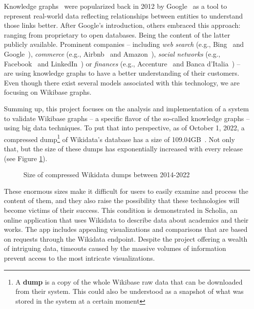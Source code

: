 Knowledge graphs~\cite{https://doi.org/10.48550/arxiv.2110.11709} were popularized back in 2012 by Google~\cite{web:knowledge_graphs:google} as a tool to represent real-world data reflecting relationships between entities to understand those links better. After Google's introduction, others embraced this approach: ranging from proprietary to open databases. Being the content of the latter publicly available. Prominent companies -- including \textit{web search} (e.g., Bing~\cite{knowledge:graphs:usage:bing} and Google~\cite{web:knowledge_graphs:google}), \textit{commerce} (e.g., Airbnb~\cite{knowledge:graphs:usage:airbnb} and Amazon~\cite{knowledge:graphs:usage:amazon}), \textit{social networks} (e.g., Facebook~\cite{knowledge:graphs:usage:facebook} and LinkedIn~\cite{knowledge:graphs:usage:linkedin}) or \textit{finances} (e.g., Accenture~\cite{knowledge:graphs:usage:accenture} and Banca d'Italia~\cite{https://doi.org/10.48550/arxiv.2010.05172}) -- are using knowledge graphs to have a better understanding of their customers. Even though there exist several models associated with this technology, we are focusing on Wikibase graphs.

Summing up, this project focuses on the analysis and implementation of a system to validate Wikibase graphs -- a specific flavor of the so-called knowledge graphs -- using big data techniques. To put that into perspective, as of October 1, 2022, a compressed dump\footnote{A \textbf{dump} is a copy of the whole Wikibase raw data that can be downloaded from their system. This could also be understood as a snapshot of what was stored in the system at a certain moment} of Wikidata's database has a size of 109.04GB~\cite{wikidata:dumps}. Not only that, but the size of these dumps has exponentially increased with every release (see Figure \ref{fig:dumps}).

\begin{figure}[ht]
    \centering
    
    \caption[Plot showing the size of compressed dumps between 2014-22]{Size of compressed Wikidata dumps between 2014-2022~\cite{https://doi.org/10.48550/arxiv.2110.11709}}
    \label{fig:dumps}
\end{figure}

These enormous sizes make it difficult for users to easily examine and process the content of them, and they also raise the possibility that these technologies will become victims of their success. This condition is demonstrated in Scholia, an online application that uses Wikidata to describe data about academics and their works. The app includes appealing visualizations and comparisons that are based on requests through the Wikidata endpoint. Despite the project offering a wealth of intriguing data, timeouts caused by the massive volumes of information prevent access to the most intricate visualizations.

